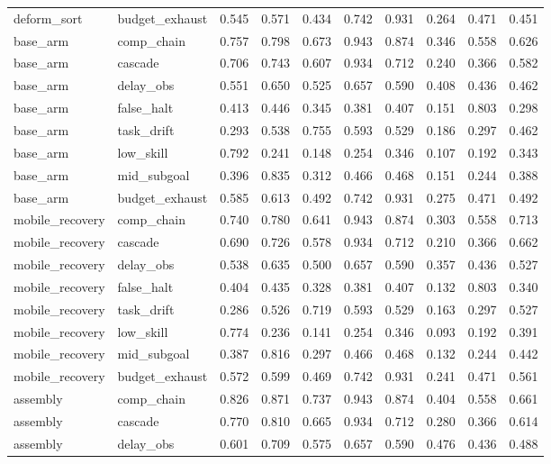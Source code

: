 \documentclass{article}
\begin{document}
\begin{longtable}{@{}llrrrrrrrr@{}}
deform\_sort & budget\_exhaust & 0.545 & 0.571 & 0.434 & 0.742 & 0.931 & 0.264 & 0.471 & 0.451 \\
base\_arm & comp\_chain & 0.757 & 0.798 & 0.673 & 0.943 & 0.874 & 0.346 & 0.558 & 0.626 \\
base\_arm & cascade & 0.706 & 0.743 & 0.607 & 0.934 & 0.712 & 0.240 & 0.366 & 0.582 \\
base\_arm & delay\_obs & 0.551 & 0.650 & 0.525 & 0.657 & 0.590 & 0.408 & 0.436 & 0.462 \\
base\_arm & false\_halt & 0.413 & 0.446 & 0.345 & 0.381 & 0.407 & 0.151 & 0.803 & 0.298 \\
base\_arm & task\_drift & 0.293 & 0.538 & 0.755 & 0.593 & 0.529 & 0.186 & 0.297 & 0.462 \\
base\_arm & low\_skill & 0.792 & 0.241 & 0.148 & 0.254 & 0.346 & 0.107 & 0.192 & 0.343 \\
base\_arm & mid\_subgoal & 0.396 & 0.835 & 0.312 & 0.466 & 0.468 & 0.151 & 0.244 & 0.388 \\
base\_arm & budget\_exhaust & 0.585 & 0.613 & 0.492 & 0.742 & 0.931 & 0.275 & 0.471 & 0.492 \\
mobile\_recovery & comp\_chain & 0.740 & 0.780 & 0.641 & 0.943 & 0.874 & 0.303 & 0.558 & 0.713 \\
mobile\_recovery & cascade & 0.690 & 0.726 & 0.578 & 0.934 & 0.712 & 0.210 & 0.366 & 0.662 \\
mobile\_recovery & delay\_obs & 0.538 & 0.635 & 0.500 & 0.657 & 0.590 & 0.357 & 0.436 & 0.527 \\
mobile\_recovery & false\_halt & 0.404 & 0.435 & 0.328 & 0.381 & 0.407 & 0.132 & 0.803 & 0.340 \\
mobile\_recovery & task\_drift & 0.286 & 0.526 & 0.719 & 0.593 & 0.529 & 0.163 & 0.297 & 0.527 \\
mobile\_recovery & low\_skill & 0.774 & 0.236 & 0.141 & 0.254 & 0.346 & 0.093 & 0.192 & 0.391 \\
mobile\_recovery & mid\_subgoal & 0.387 & 0.816 & 0.297 & 0.466 & 0.468 & 0.132 & 0.244 & 0.442 \\
mobile\_recovery & budget\_exhaust & 0.572 & 0.599 & 0.469 & 0.742 & 0.931 & 0.241 & 0.471 & 0.561 \\
assembly & comp\_chain & 0.826 & 0.871 & 0.737 & 0.943 & 0.874 & 0.404 & 0.558 & 0.661 \\
assembly & cascade & 0.770 & 0.810 & 0.665 & 0.934 & 0.712 & 0.280 & 0.366 & 0.614 \\
assembly & delay\_obs & 0.601 & 0.709 & 0.575 & 0.657 & 0.590 & 0.476 & 0.436 & 0.488 \\

\end{longtable}
\end{document}
